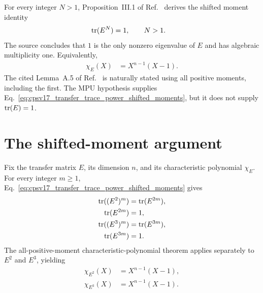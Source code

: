 \documentclass{article}
\begin{document}
For every integer $N>1$, Proposition~III.1 of
Ref.~\cite{Cirac2017MPU} derives the shifted moment identity
\begin{align}
    \operatorname{tr}(E^N)
        &= 1,
        \qquad N>1.
    \label{eq:cpsv17_transfer_trace_power_shifted_moments}
\end{align}
The source concludes that $1$ is the only nonzero eigenvalue of $E$ and has
algebraic multiplicity one. Equivalently,
\begin{align}
    \chi_E(X)
        &= X^{n-1}(X-1).
    \label{eq:cpsv17_transfer_trace_power_source_characteristic_polynomial}
\end{align}
The cited Lemma~A.5 of Ref.~\cite{Cirac2016MPDO_arXiv} is naturally stated
using all positive moments, including the first. The MPU hypothesis supplies
Eq.~\ref{eq:cpsv17_transfer_trace_power_shifted_moments}, but it does not
supply $\operatorname{tr}(E)=1$.

\section{The shifted-moment argument}

Fix the transfer matrix $E$, its dimension $n$, and its characteristic
polynomial $\chi_E$. For every integer $m\geq1$,
Eq.~\ref{eq:cpsv17_transfer_trace_power_shifted_moments} gives
\begin{align}
    \operatorname{tr}((E^2)^m)
        &= \operatorname{tr}(E^{2m}),
    \label{eq:cpsv17_transfer_trace_power_square_moment_reduction}\\
    \operatorname{tr}(E^{2m})
        &= 1,
    \label{eq:cpsv17_transfer_trace_power_square_moments}\\
    \operatorname{tr}((E^3)^m)
        &= \operatorname{tr}(E^{3m}),
    \label{eq:cpsv17_transfer_trace_power_cube_moment_reduction}\\
    \operatorname{tr}(E^{3m})
        &= 1.
    \label{eq:cpsv17_transfer_trace_power_cube_moments}
\end{align}
The all-positive-moment characteristic-polynomial theorem applies separately
to $E^2$ and $E^3$, yielding
\begin{align}
    \chi_{E^2}(X)
        &= X^{n-1}(X-1),
    \label{eq:cpsv17_transfer_trace_power_square_characteristic_polynomial}\\
    \chi_{E^3}(X)
        &= X^{n-1}(X-1).
    \label{eq:cpsv17_transfer_trace_power_cube_characteristic_polynomial}
\end{align}
\end{document}
